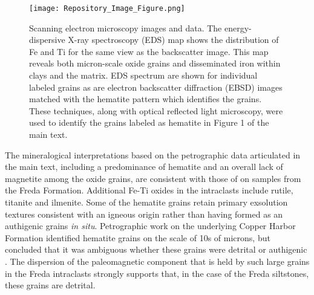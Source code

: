 \documentclass[11pt,letterpaper]{article}
\begin{document}
\begin{figure}[!ht]
\centering
\noindent\texttt{[image: Repository\_Image\_Figure.png]}
\caption{\small{Scanning electron microscopy images and data. The energy-dispersive X-ray spectroscopy (EDS) map shows the distribution of Fe and Ti for the same view as the backscatter image. This map reveals both micron-scale oxide grains and disseminated iron within clays and the matrix. EDS spectrum are shown for individual labeled grains as are electron backscatter diffraction (EBSD) images matched with the hematite pattern which identifies the grains. These techniques, along with optical reflected light microscopy, were used to identify the grains labeled as hematite in Figure 1 of the main text.}}
\label{fig:sem_images}
\end{figure} 

The mineralogical interpretations based on the petrographic data articulated in the main text, including a predominance of hematite and an overall lack of magnetite among the oxide grains, are consistent with those of \cite{Vincenz1968b} on samples from the Freda Formation. Additional Fe-Ti oxides in the intraclasts include rutile, titanite and ilmenite. Some of the hematite grains retain primary exsolution textures consistent with an igneous origin rather than having formed as an authigenic grains \textit{in situ}. Petrographic work on the underlying Copper Harbor Formation identified hematite grains on the scale of 10s of microns, but concluded that it was ambiguous whether these grains were detrital or authigenic \citep{Elmore1982a}. The dispersion of the paleomagnetic component that is held by such large grains in the Freda intraclasts strongly supports that, in the case of the Freda siltstones, these grains are detrital.



\end{document}
